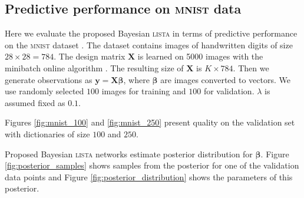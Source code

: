 \documentclass[letterpaper]{article}
\begin{document}


\subsection{Predictive performance on \textsc{mnist} data}
Here we evaluate the proposed Bayesian \textsc{lista} in terms of predictive performance on the \textsc{mnist} dataset \citep{lecun1998gradient}. The dataset contains images of handwritten digits of size $28 \times 28 = 784$. The design matrix $\mathbf{X}$ is learned on 5000 images with the minibatch online algorithm \citep{mairal2009online}. The resulting size of $\mathbf{X}$ is $K \times 784$. Then we generate observations as $\mathbf{y} = \mathbf{X}\boldsymbol\beta$, where $\boldsymbol\beta$ are images converted to vectors. We use randomly selected $100$ images for training and $100$ for validation. $\lambda$ is assumed fixed as $0.1$.

Figures \ref{fig:mnist_100} and \ref{fig:mnist_250} present quality on the validation set with dictionaries of size $100$ and $250$. 

Proposed Bayesian \textsc{lista} networks estimate posterior distribution for $\boldsymbol\beta$. Figure \ref{fig:posterior_samples} shows samples from the posterior for one of the validation data points and Figure \ref{fig:posterior_distribution} shows the parameters of this posterior.
\end{document}
